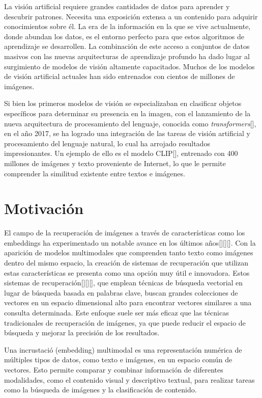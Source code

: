 La visi\'on artificial requiere grandes cantidades de datos para aprender y descubrir patrones. Necesita una exposici\'on extensa a un contenido para adquirir conocimientos sobre \'el. La era de la informaci\'on en la que se vive actualmente, donde abundan los datos, es el entorno perfecto para que estos algoritmos de aprendizaje se desarrollen. La combinaci\'on de este acceso a conjuntos de datos masivos con las nuevas arquitecturas de aprendizaje profundo ha dado lugar al surgimiento de modelos de visi\'on altamente capacitados. Muchos de los modelos de visi\'on artificial actuales han sido entrenados con cientos de millones de im\'agenes.

Si bien los primeros modelos de visi\'on se especializaban en clasificar objetos espec\'ificos para determinar su presencia en la imagen, con el lanzamiento de la nueva arquitectura de procesamiento del lenguaje, conocida como \textit{transformers}[\cite{transformers}], en el a\~no 2017, se ha logrado una integraci\'on de las tareas de visi\'on artificial y procesamiento del lenguaje natural, lo cual ha arrojado resultados impresionantes. Un ejemplo de ello es el modelo CLIP[\cite{clip-paper}], entrenado con 400 millones de im\'agenes y texto proveniente de Internet, lo que le permite comprender la similitud existente entre textos e im\'agenes.

\section*{Motivaci\'on}
El campo de la recuperación de imágenes a través de características como los embeddings ha experimentado un notable avance en los últimos años[\cite{embedding1}][\cite{embedding2}][\cite{Baldrati2022}]. Con la aparición de modelos multimodales que comprenden tanto texto como imágenes dentro del mismo espacio, la creación de sistemas de recuperación que utilizan estas características se presenta como una opción muy útil e innovadora. Estos sistemas de recuperación[\cite{keita2023clip}][\cite{Baldrati2022}][\cite{embedding2}], que emplean técnicas de búsqueda vectorial en lugar de búsqueda basada en palabras clave, buscan grandes colecciones de vectores en un espacio dimensional alto para encontrar vectores similares a una consulta determinada. Este enfoque suele ser más eficaz que las técnicas tradicionales de recuperación de imágenes, ya que puede reducir el espacio de búsqueda y mejorar la precisión de los resultados.

Una incrustaci\'o (embedding) multimodal es una representación numérica de múltiples tipos de datos, como texto e imágenes, en un espacio común de vectores. Esto permite comparar y combinar información de diferentes modalidades, como el contenido visual y descriptivo textual, para realizar tareas como la búsqueda de imágenes y la clasificación de contenido.

